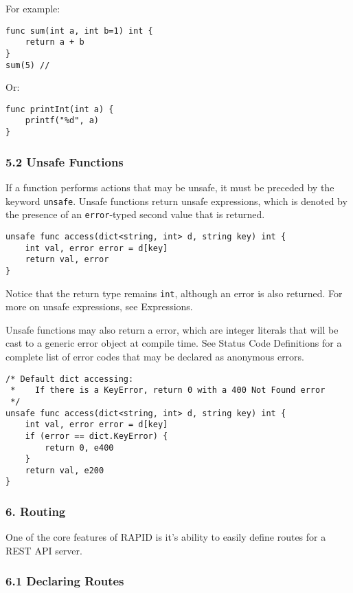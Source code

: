 For example:

\begin{verbatim}
func sum(int a, int b=1) int {
    return a + b
}
sum(5) //
\end{verbatim}

Or:

\begin{verbatim}
func printInt(int a) {
    printf("%d", a)
}
\end{verbatim}

\subsubsection{5.2 Unsafe Functions}\label{unsafe-functions}

If a function performs actions that may be unsafe, it must be preceded
by the keyword \texttt{unsafe}. Unsafe functions return unsafe
expressions, which is denoted by the presence of an \texttt{error}-typed
second value that is returned.

\begin{verbatim}
unsafe func access(dict<string, int> d, string key) int {
    int val, error error = d[key]
    return val, error
}
\end{verbatim}

Notice that the return type remains \texttt{int}, although an error is
also returned. For more on unsafe expressions, see Expressions.

Unsafe functions may also return a error, which are integer literals
that will be cast to a generic error object at compile time. See Status
Code Definitions for a complete list of error codes that may be declared
as anonymous errors.

\begin{verbatim}
/* Default dict accessing:
 *    If there is a KeyError, return 0 with a 400 Not Found error
 */
unsafe func access(dict<string, int> d, string key) int {
    int val, error error = d[key]
    if (error == dict.KeyError) {
        return 0, e400
    }
    return val, e200
}
\end{verbatim}

\subsubsection{6. Routing}\label{routing}

One of the core features of RAPID is it's ability to easily define
routes for a REST API server.

\subsubsection{6.1 Declaring Routes}\label{declaring-routes}


